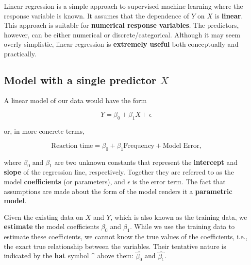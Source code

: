 \documentclass[
  11pt,
  letterpaper,
  DIV=11,
  numbers=noendperiod]{scrreprt}
\begin{document}
Linear regression is a simple approach to supervised machine learning
where the response variable is known. It assumes that the dependence of
\(Y\) on \(X\) is \textbf{linear}. This approach is suitable for
\textbf{numerical response variables}. The predictors, however, can be
either numerical or discrete/categorical. Although it may seem overly
simplistic, linear regression is \textbf{extremely useful} both
conceptually and practically.

\subsection{\texorpdfstring{Model with a single predictor
\(X\)}{Model with a single predictor X}}\label{model-with-a-single-predictor-x}

A linear model of our data would have the form

\[ Y = \beta_0 + \beta_1X + \epsilon \]

or, in more concrete terms,

\[ \text{Reaction time} = \beta_0 + \beta_1\text{Frequency} + \text{Model Error,} \]

where \(\beta_0\) and \(\beta_1\) are two unknown constants that
represent the \textbf{intercept} and \textbf{slope} of the regression
line, respectively. Together they are referred to as the model
\textbf{coefficients} (or parameters), and \(\epsilon\) is the error
term. The fact that assumptions are made about the form of the model
renders it a \textbf{parametric model}.

Given the existing data on \(X\) and \(Y\), which is also known as the
training data, we \textbf{estimate} the model coefficients \(\beta_0\)
and \(\beta_1\). While we use the training data to estimate these
coefficients, we cannot know the true values of the coefficients, i.e.,
the exact true relationship between the variables. Their tentative
nature is indicated by the \textbf{hat} symbol \^{} above them:
\(\hat{\beta_0}\) and \(\hat{\beta_1}\).
\end{document}
